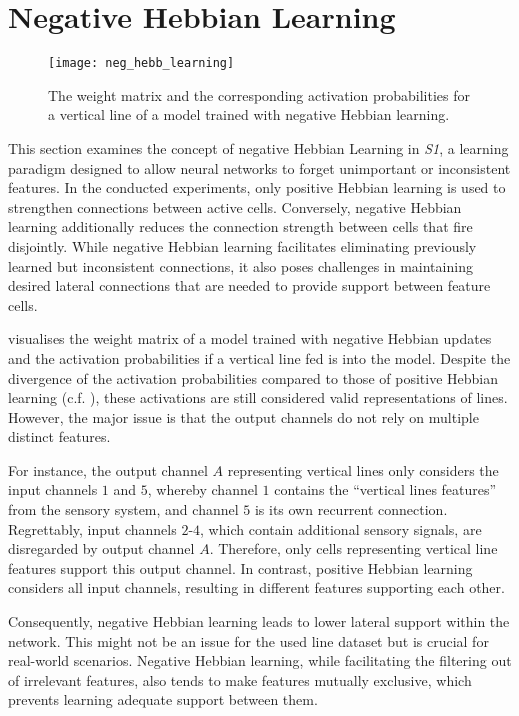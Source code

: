 \chapter{Negative Hebbian Learning}
%
\begin{figure}[h]
    \centering
    \texttt{[image: neg\_hebb\_learning]}
    \caption[Weight matrix and activations with negative Hebbian learning]{The weight matrix and the corresponding activation probabilities for a vertical line of a model trained with negative Hebbian learning.}
\end{figure}
%
This section examines the concept of negative Hebbian Learning in \emph{S1}, a learning paradigm designed to allow neural networks to forget unimportant or inconsistent features. 
In the conducted experiments, only positive Hebbian learning  is used to strengthen connections between active cells.
Conversely, negative Hebbian learning additionally reduces the connection strength between cells that fire disjointly.
While negative Hebbian learning facilitates eliminating previously learned but inconsistent connections, it also poses challenges in maintaining desired lateral connections that are needed to provide support between feature cells.


 visualises the weight matrix of a model trained with negative Hebbian updates and the activation probabilities if a vertical line fed is into the model.
Despite the divergence of the activation probabilities compared to those of positive Hebbian learning (c.f. ), these activations are still considered valid representations of lines.
However, the major issue is that the output channels do not rely on multiple distinct features.

For instance, the output channel $A$ representing vertical lines only considers the input channels $1$ and $5$, whereby channel $1$ contains the ``vertical lines features'' from the sensory system, and channel $5$ is its own recurrent connection.
Regrettably, input channels $2$-$4$, which contain additional sensory signals, are disregarded by output channel $A$. Therefore, only cells representing vertical line features support this output channel.
In contrast, positive Hebbian learning considers all input channels, resulting in different features supporting each other.

Consequently, negative Hebbian learning leads to lower lateral support within the network.
This might not be an issue for the used line dataset but is crucial for real-world scenarios.
Negative Hebbian learning, while facilitating the filtering out of irrelevant features, also tends to make features mutually exclusive, which prevents learning adequate support between them.

